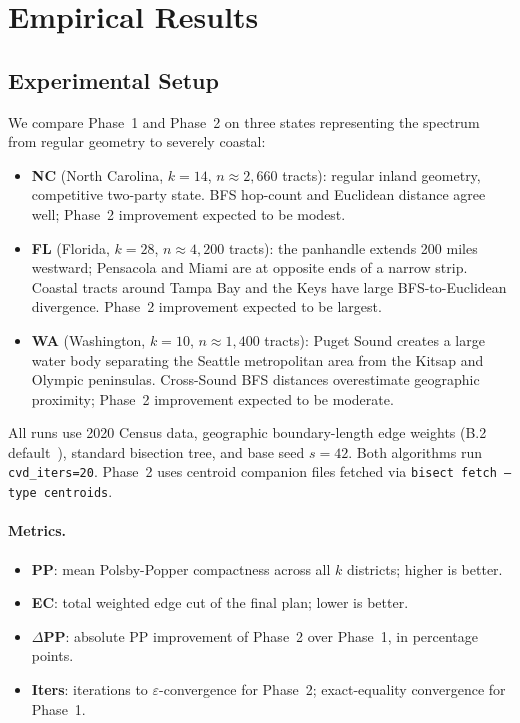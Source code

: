\section{Empirical Results}
\label{sec:results}

\subsection{Experimental Setup}

We compare Phase~1 \cvd{} and Phase~2 \cvdgeo{} on three states representing
the spectrum from regular geometry to severely coastal:

\begin{itemize}
\item \textbf{NC} (North Carolina, $k=14$, $n \approx 2{,}660$ tracts):
  regular inland geometry, competitive two-party state.
  BFS hop-count and Euclidean distance agree well; Phase~2 improvement expected
  to be modest.
\item \textbf{FL} (Florida, $k=28$, $n \approx 4{,}200$ tracts):
  the panhandle extends 200 miles westward; Pensacola and Miami are at
  opposite ends of a narrow strip.
  Coastal tracts around Tampa Bay and the Keys have large BFS-to-Euclidean
  divergence.
  Phase~2 improvement expected to be largest.
\item \textbf{WA} (Washington, $k=10$, $n \approx 1{,}400$ tracts):
  Puget Sound creates a large water body separating the Seattle metropolitan
  area from the Kitsap and Olympic peninsulas.
  Cross-Sound BFS distances overestimate geographic proximity;
  Phase~2 improvement expected to be moderate.
\end{itemize}

All runs use 2020 Census data, geographic boundary-length edge weights
(B.2 default~\citep{b2paper}), standard bisection tree, and base seed $s=42$.
Both algorithms run \texttt{cvd\_iters=20}.
Phase~2 uses centroid companion files fetched via
\texttt{bisect fetch --type centroids}.

\paragraph{Metrics.}
\begin{itemize}
\item \textbf{PP}: mean Polsby-Popper compactness across all $k$ districts; higher is better.
\item \textbf{EC}: total weighted edge cut of the final plan; lower is better.
\item \textbf{$\Delta$PP}: absolute PP improvement of Phase~2 over Phase~1, in
  percentage points.
\item \textbf{Iters}: iterations to $\varepsilon$-convergence for Phase~2;
  exact-equality convergence for Phase~1.
\end{itemize}

